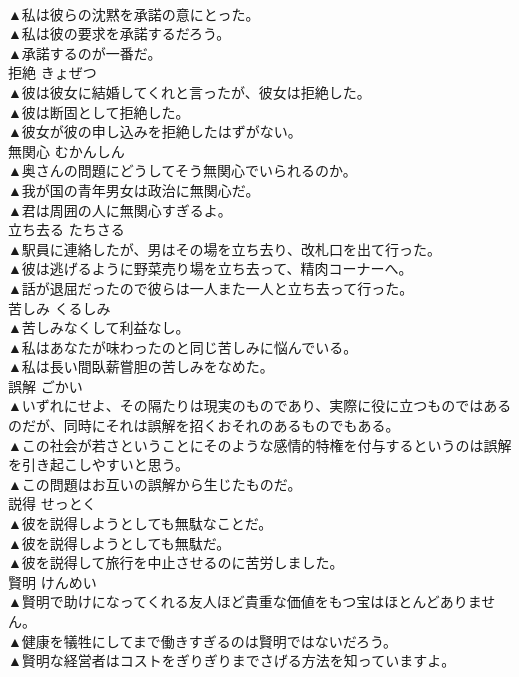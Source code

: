 \documentclass[8pt]{extreport}
\begin{document}
\begin{CJK}{UTF8}{min}
\\	▲私は彼らの沈黙を承諾の意にとった。 
\\	▲私は彼の要求を承諾するだろう。 
\\	▲承諾するのが一番だ。 
\\	拒絶	きょぜつ	
\\	▲彼は彼女に結婚してくれと言ったが、彼女は拒絶した。 
\\	▲彼は断固として拒絶した。 
\\	▲彼女が彼の申し込みを拒絶したはずがない。 
\\	無関心	むかんしん	
\\	▲奥さんの問題にどうしてそう無関心でいられるのか。 
\\	▲我が国の青年男女は政治に無関心だ。 
\\	▲君は周囲の人に無関心すぎるよ。 
\\	立ち去る	たちさる	
\\	▲駅員に連絡したが、男はその場を立ち去り、改札口を出て行った。 
\\	▲彼は逃げるように野菜売り場を立ち去って、精肉コーナーへ。 
\\	▲話が退屈だったので彼らは一人また一人と立ち去って行った。 
\\	苦しみ	くるしみ	
\\	▲苦しみなくして利益なし。 
\\	▲私はあなたが味わったのと同じ苦しみに悩んでいる。 
\\	▲私は長い間臥薪嘗胆の苦しみをなめた。 
\\	誤解	ごかい	
\\	▲いずれにせよ、その隔たりは現実のものであり、実際に役に立つものではあるのだが、同時にそれは誤解を招くおそれのあるものでもある。 
\\	▲この社会が若さということにそのような感情的特権を付与するというのは誤解を引き起こしやすいと思う。 
\\	▲この問題はお互いの誤解から生じたものだ。 
\\	説得	せっとく	
\\	▲彼を説得しようとしても無駄なことだ。 
\\	▲彼を説得しようとしても無駄だ。 
\\	▲彼を説得して旅行を中止させるのに苦労しました。 
\\	賢明	けんめい	
\\	▲賢明で助けになってくれる友人ほど貴重な価値をもつ宝はほとんどありません。 
\\	▲健康を犠牲にしてまで働きすぎるのは賢明ではないだろう。 
\\	▲賢明な経営者はコストをぎりぎりまでさげる方法を知っていますよ。 

\end{CJK}
\end{document}
